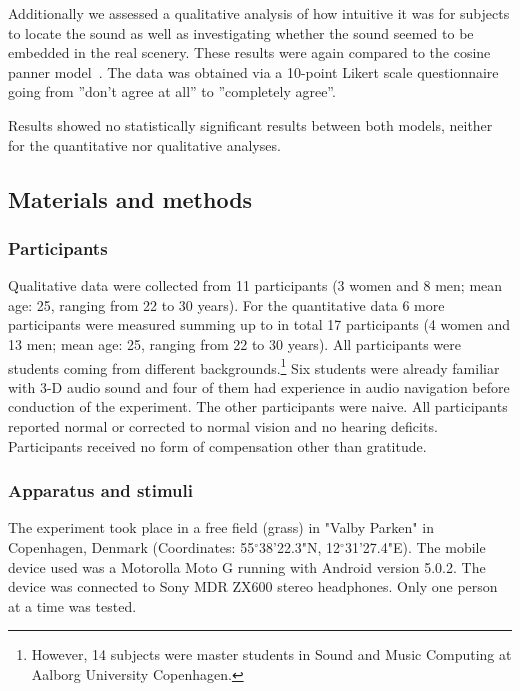 \documentclass[journal]{IEEEtran}
\begin{document}
Additionally we assessed a qualitative analysis of how intuitive it was for subjects to locate the sound as well as investigating whether the sound seemed to be embedded in the real scenery. These results were again compared to the cosine panner model~\cite{AndyFarnell2010}. The data was obtained via a 10-point Likert scale questionnaire going from ''don't agree at all'' to ''completely agree''.

Results showed no statistically significant results between both models, neither for the quantitative nor qualitative analyses.
\subsection{Materials and methods}
\subsubsection{Participants}
Qualitative data were collected from 11 participants (3 women and 8 men; mean age: 25, ranging from 22 to 30 years). For the quantitative data 6 more participants were measured summing up to in total 17 participants (4 women and 13 men; mean age: 25, ranging from 22 to 30 years). All participants were students coming from different backgrounds.\footnote{However, 14 subjects were master students in Sound and Music Computing at Aalborg University Copenhagen.} Six students were already familiar with 3-D audio sound and four of them had experience in audio navigation before conduction of the experiment. The other participants were naive. All participants reported normal or corrected to normal vision and no hearing deficits. Participants received no form of compensation other than gratitude. 

\subsubsection{Apparatus and stimuli}
The experiment took place in a free field (grass) in "Valby Parken" in Copenhagen, Denmark (Coordinates: 55$^\circ$38'22.3"N, 12$^\circ$31'27.4"E). The mobile device used was a Motorolla Moto G running with Android version 5.0.2. The device was connected to Sony MDR ZX600 stereo headphones. Only one person at a time was tested. 
\end{document}
